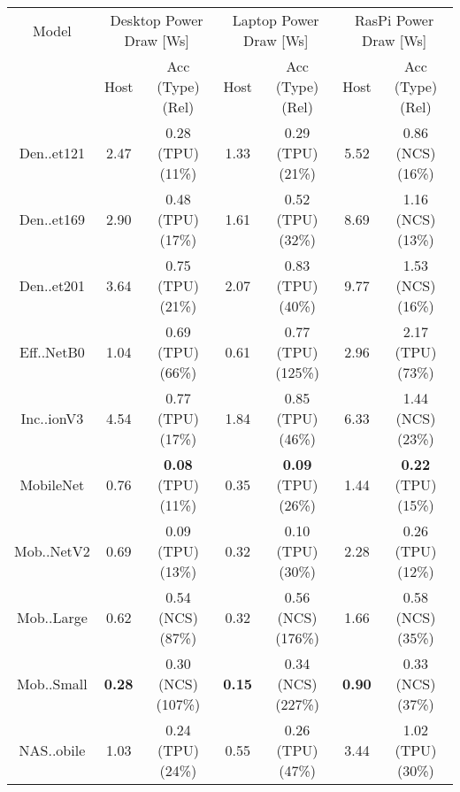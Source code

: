 \begin{tabular}{c|cc|cc|cc}
        Model & \multicolumn{2}{c}{Desktop Power Draw [Ws]} & \multicolumn{2}{c}{Laptop Power Draw [Ws]} & \multicolumn{2}{c}{RasPi Power Draw [Ws]} \\
         & Host & Acc (Type) (Rel) & Host & Acc (Type) (Rel) & Host & Acc (Type) (Rel) \\
         \midrule
        Den..et121 & 2.47 & 0.28 (\colorbox{RC}{TPU}) (\colorbox{RA}{11\%}) & 1.33 & 0.29 (\colorbox{RC}{TPU}) (\colorbox{RC}{21\%}) & 5.52 & 0.86 (\colorbox{RA}{NCS}) (\colorbox{RA}{16\%}) \\
        Den..et169 & 2.90 & 0.48 (\colorbox{RC}{TPU}) (\colorbox{RA}{17\%}) & 1.61 & 0.52 (\colorbox{RC}{TPU}) (\colorbox{RC}{32\%}) & 8.69 & 1.16 (\colorbox{RA}{NCS}) (\colorbox{RA}{13\%}) \\
        Den..et201 & 3.64 & 0.75 (\colorbox{RC}{TPU}) (\colorbox{RC}{21\%}) & 2.07 & 0.83 (\colorbox{RC}{TPU}) (\colorbox{RC}{40\%}) & 9.77 & 1.53 (\colorbox{RA}{NCS}) (\colorbox{RA}{16\%}) \\
        Eff..NetB0 & 1.04 & 0.69 (\colorbox{RC}{TPU}) (\colorbox{RE}{66\%}) & 0.61 & 0.77 (\colorbox{RC}{TPU}) (\colorbox{RE}{125\%}) & 2.96 & 2.17 (\colorbox{RC}{TPU}) (\colorbox{RE}{73\%}) \\
        Inc..ionV3 & 4.54 & 0.77 (\colorbox{RC}{TPU}) (\colorbox{RA}{17\%}) & 1.84 & 0.85 (\colorbox{RC}{TPU}) (\colorbox{RC}{46\%}) & 6.33 & 1.44 (\colorbox{RA}{NCS}) (\colorbox{RC}{23\%}) \\
        MobileNet & 0.76 & \textbf{0.08} (\colorbox{RC}{TPU}) (\colorbox{RA}{11\%}) & 0.35 & \textbf{0.09} (\colorbox{RC}{TPU}) (\colorbox{RC}{26\%}) & 1.44 & \textbf{0.22} (\colorbox{RC}{TPU}) (\colorbox{RA}{15\%}) \\
        Mob..NetV2 & 0.69 & 0.09 (\colorbox{RC}{TPU}) (\colorbox{RA}{13\%}) & 0.32 & 0.10 (\colorbox{RC}{TPU}) (\colorbox{RC}{30\%}) & 2.28 & 0.26 (\colorbox{RC}{TPU}) (\colorbox{RA}{12\%}) \\
        Mob..Large & 0.62 & 0.54 (\colorbox{RA}{NCS}) (\colorbox{RE}{87\%}) & 0.32 & 0.56 (\colorbox{RA}{NCS}) (\colorbox{RE}{176\%}) & 1.66 & 0.58 (\colorbox{RA}{NCS}) (\colorbox{RC}{35\%}) \\
        Mob..Small & \textbf{0.28}  & 0.30 (\colorbox{RA}{NCS}) (\colorbox{RE}{107\%}) & \textbf{0.15}  & 0.34 (\colorbox{RA}{NCS}) (\colorbox{RE}{227\%}) & \textbf{0.90}  & 0.33 (\colorbox{RA}{NCS}) (\colorbox{RC}{37\%}) \\
        NAS..obile & 1.03 & 0.24 (\colorbox{RC}{TPU}) (\colorbox{RC}{24\%}) & 0.55 & 0.26 (\colorbox{RC}{TPU}) (\colorbox{RC}{47\%}) & 3.44 & 1.02 (\colorbox{RC}{TPU}) (\colorbox{RC}{30\%}) \\

\end{tabular}
